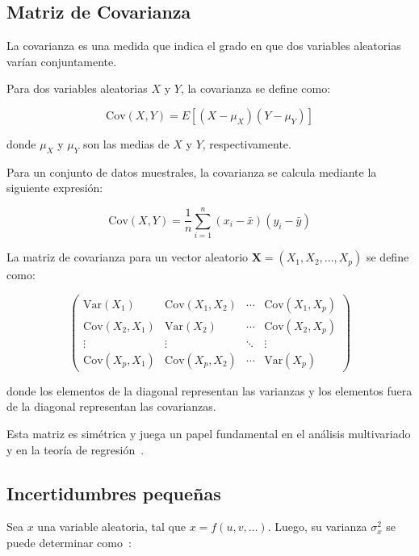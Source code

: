 \documentclass[twocolumn]{article}
\begin{document}
\subsection{Matriz de Covarianza}\label{covarianza}
La covarianza es una medida que indica el grado en que dos variables aleatorias varían conjuntamente.

Para dos variables aleatorias $X$ y $Y$, la covarianza se define como:

\begin{equation}
\mathrm{Cov}(X,Y) = E[(X - \mu_X)(Y - \mu_Y)]
\end{equation}

donde $\mu_X$ y $\mu_Y$ son las medias de $X$ y $Y$, respectivamente.

Para un conjunto de datos muestrales, la covarianza se calcula mediante la siguiente expresión:

\begin{equation}
\mathrm{Cov}(X,Y) = \frac{1}{n} \sum_{i=1}^{n} (x_i - \bar{x})(y_i - \bar{y})
\end{equation}

La matriz de covarianza para un vector aleatorio $\mathbf{X} = (X_1, X_2, \dots, X_p)$ se define como:

\begin{equation}
\begin{pmatrix}
\mathrm{Var}(X_1) & \mathrm{Cov}(X_1,X_2) & \cdots & \mathrm{Cov}(X_1,X_p) \\
\mathrm{Cov}(X_2,X_1) & \mathrm{Var}(X_2) & \cdots & \mathrm{Cov}(X_2,X_p) \\
\vdots & \vdots & \ddots & \vdots \\
\mathrm{Cov}(X_p,X_1) & \mathrm{Cov}(X_p,X_2) & \cdots & \mathrm{Var}(X_p)
\end{pmatrix}
\end{equation}

donde los elementos de la diagonal representan las varianzas y los elementos fuera de la diagonal representan las covarianzas.

Esta matriz es simétrica y juega un papel fundamental en el análisis multivariado y en la teoría de regresión~\cite{marques1991probabilidad}.

\subsection{Incertidumbres pequeñas} \label{Inceridumbres pequeñas}
Sea $x$ una variable aleatoria, tal que $x=f(u,v,\dots)$. Luego, su varianza $\sigma_x^2$ se puede determinar como~\cite{bevington2003data}:
\end{document}
